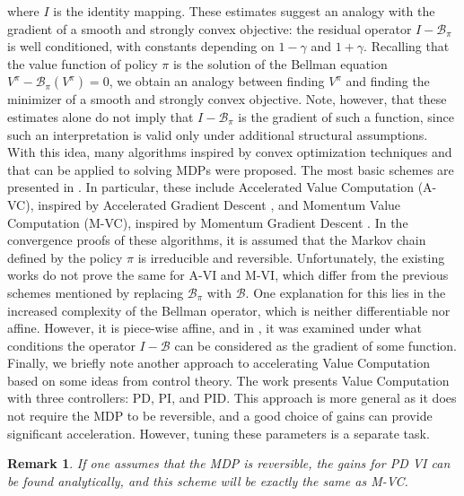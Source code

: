 \documentclass{article}
\numberwithin{equation}{section}
\newtheorem{remark}{Remark}
\begin{document}
where $I$ is the identity mapping. 
These estimates suggest an analogy with the gradient of a smooth and strongly convex objective: the residual operator \(I-\mathcal{B}_{\pi}\) is well conditioned, with constants depending on \(1-\gamma\) and \(1+\gamma\). Recalling that the value function of policy \(\pi\) is the solution of the Bellman equation \(V^{\pi} - \mathcal{B}_{\pi}(V^{\pi}) = 0\), we obtain an analogy between finding \(V^{\pi}\) and finding the minimizer of a smooth and strongly convex objective. Note, however, that these estimates alone do not imply that \(I-\mathcal{B}_{\pi}\) is the gradient of such a function, since such an interpretation is valid only under additional structural assumptions.
With this idea, many algorithms inspired by convex optimization techniques and that can be applied to solving MDPs were proposed. The most basic schemes are presented in \cite{grand2021convex}. In particular, these include Accelerated Value Computation (A-VC), inspired by Accelerated Gradient Descent \citep{nesterov1983method,nesterov2013introductory}, and Momentum Value Computation (M-VC), inspired by Momentum Gradient Descent \citep{polyak1964some}.
In the convergence proofs of these algorithms, it is assumed that the Markov chain defined by the policy $\pi$ is irreducible and reversible. Unfortunately, the existing works do not prove the same for A-VI and M-VI, which differ from the previous schemes mentioned by replacing $\mathcal{B}_{\pi}$ with $\mathcal{B}$. One explanation for this lies in the increased complexity of the Bellman operator, which is neither differentiable nor affine. However, it is piece-wise affine, and in \cite{goyal2023first}, it was examined under what conditions the operator $I - \mathcal{B}$ can be considered as the gradient of some function.
Finally, we briefly note another approach to accelerating Value Computation based on some ideas from control theory. The work \citep{farahmand2021pid} presents Value Computation with three controllers: PD, PI, and PID. This approach is more general as it does not require the MDP to be reversible, and a good choice of gains can provide significant acceleration. However, tuning these parameters is a separate task.

\begin{remark}
     If one assumes that the MDP is reversible, the gains for PD VI can be found analytically, and this scheme will be exactly the same as M-VC.
\end{remark}
\end{document}
